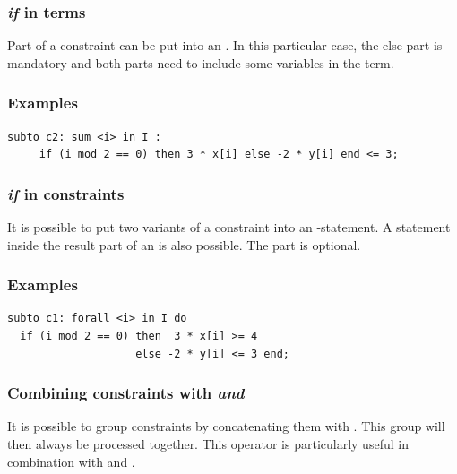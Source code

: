 \subsubsection{\emph{if} in terms}
Part of a constraint can be put into an .
In this particular case, the else part is mandatory and both parts
need to include some variables in the term.

\subsubsection{Examples}
{\small
\begin{verbatim}
subto c2: sum <i> in I :
     if (i mod 2 == 0) then 3 * x[i] else -2 * y[i] end <= 3;
\end{verbatim}
}

\subsubsection{\emph{if} in constraints}
It is possible to put two variants of a constraint into an
-statement.
A  statement inside the result part of an  is
also possible. The  part is optional.

\subsubsection{Examples}
{\small
\begin{verbatim}
subto c1: forall <i> in I do
  if (i mod 2 == 0) then  3 * x[i] >= 4
                    else -2 * y[i] <= 3 end;
\end{verbatim}
}

\subsubsection{Combining constraints with \emph{and}}
It is possible to group constraints by concatenating them with
. This group will then always be processed together.
This operator is particularly useful in combination with  and .

